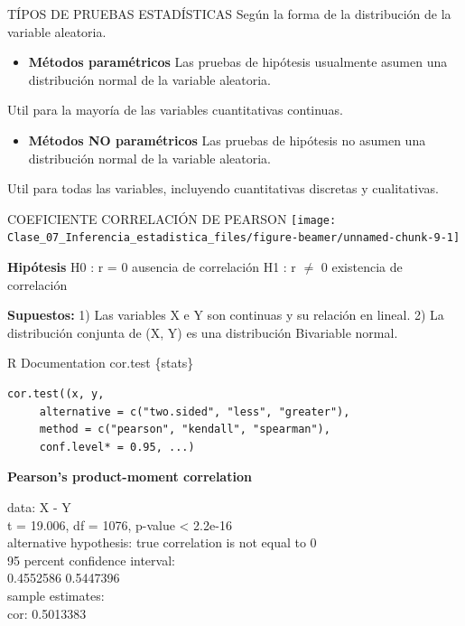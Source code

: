 \documentclass[
  ignorenonframetext,
]{beamer}
\providecommand{\tightlist}{%
  \setlength{\itemsep}{0pt}\setlength{\parskip}{0pt}}
\begin{document}
\begin{frame}{TÍPOS DE PRUEBAS ESTADÍSTICAS}
\protect\hypertarget{tuxedpos-de-pruebas-estaduxedsticas}{}
Según la forma de la distribución de la variable aleatoria.

\begin{itemize}
\tightlist
\item
  \textbf{Métodos paramétricos} Las pruebas de hipótesis usualmente
  asumen una distribución normal de la variable aleatoria.
\end{itemize}

Util para la mayoría de las variables cuantitativas continuas.

\begin{itemize}
\tightlist
\item
  \textbf{Métodos NO paramétricos} Las pruebas de hipótesis no asumen
  una distribución normal de la variable aleatoria.
\end{itemize}

Util para todas las variables, incluyendo cuantitativas discretas y
cualitativas.
\end{frame}

\begin{frame}{COEFICIENTE CORRELACIÓN DE PEARSON}
\protect\hypertarget{coeficiente-correlaciuxf3n-de-pearson}{}
\texttt{[image: Clase\_07\_Inferencia\_estadistica\_files/figure-beamer/unnamed-chunk-9-1]}

\textbf{Hipótesis} H0 : r = 0 ausencia de correlación H1 : r \(\neq\) 0
existencia de correlación

\textbf{Supuestos:} 1) Las variables X e Y son continuas y su relación
en lineal. 2) La distribución conjunta de (X, Y) es una distribución
Bivariable normal.
\end{frame}

\begin{frame}[fragile]{R Documentation cor.test \{stats\}}
\protect\hypertarget{r-documentation-cor.test-stats}{}
\begin{verbatim}
cor.test((x, y,
     alternative = c("two.sided", "less", "greater"),
     method = c("pearson", "kendall", "spearman"),
     conf.level* = 0.95, ...)
\end{verbatim}

\textbf{Pearson's product-moment correlation}

data: X - Y\\
t = 19.006, df = 1076, p-value \textless{} 2.2e-16\\
alternative hypothesis: true correlation is not equal to 0\\
95 percent confidence interval:\\
0.4552586 0.5447396\\
sample estimates:\\
cor: 0.5013383
\end{frame}
\end{document}
